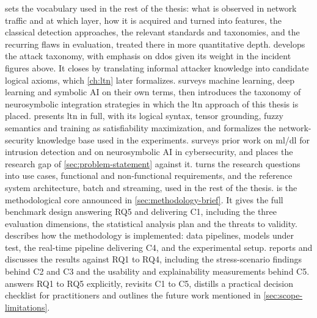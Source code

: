  sets the vocabulary used in the rest of the thesis:
what is observed in network traffic and at which layer, how it is acquired
and turned into features, the classical detection approaches, the relevant
standards and taxonomies, and the recurring flaws in evaluation, treated
there in more quantitative depth.
 develops the attack taxonomy, with emphasis on
\gls{ddos} given its weight in the incident figures above. It closes by
translating informal attacker knowledge into candidate logical axioms, which
\cref{ch:ltn} later formalizes.
 surveys machine learning, deep learning and
symbolic AI on their own terms, then introduces the taxonomy of
neurosymbolic integration strategies in which the \gls{ltn} approach of this
thesis is placed.
 presents \gls{ltn} in full, with its logical syntax, tensor
grounding, fuzzy semantics and training as satisfiability maximization, and
formalizes the network-security knowledge base used in the experiments.
 surveys prior work on \gls{ml}/\gls{dl} for intrusion
detection and on neurosymbolic AI in cybersecurity, and places the research
gap of \cref{sec:problem-statement} against it.
 turns the research questions into use cases,
functional and non-functional requirements, and the reference system
architecture, batch and streaming, used in the rest of the thesis.
 is the methodological core announced in
\cref{sec:methodology-brief}. It gives the full benchmark design answering
RQ5 and delivering C1, including the three evaluation dimensions, the
statistical analysis plan and the threats to validity.
 describes how the methodology is implemented: data
pipelines, models under test, the real-time pipeline delivering C4, and the
experimental setup.
 reports and discusses the results against RQ1 to RQ4,
including the stress-scenario findings behind C2 and C3 and the usability
and explainability measurements behind C5.
 answers RQ1 to RQ5 explicitly, revisits C1 to C5,
distills a practical decision checklist for practitioners and outlines the
future work mentioned in \cref{sec:scope-limitations}.